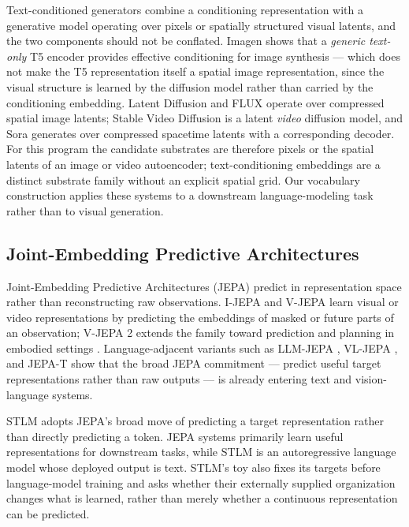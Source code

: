 \documentclass[11pt,a4paper]{article}
\begin{document}
Text-conditioned generators combine a conditioning representation with a generative model operating over pixels or spatially structured visual latents, and the two components should not be conflated. Imagen \cite{imagen2022} shows that a \emph{generic text-only} T5 encoder provides effective conditioning for image synthesis --- which does not make the T5 representation itself a spatial image representation, since the visual structure is learned by the diffusion model rather than carried by the conditioning embedding. Latent Diffusion \cite{stablediffusion} and FLUX \cite{flux2024} operate over compressed spatial image latents; Stable Video Diffusion \cite{svd2023} is a latent \emph{video} diffusion model, and Sora \cite{sora2024} generates over compressed spacetime latents with a corresponding decoder. For this program the candidate substrates are therefore pixels or the spatial latents of an image or video autoencoder; text-conditioning embeddings are a distinct substrate family without an explicit spatial grid. Our vocabulary construction applies these systems to a downstream language-modeling task rather than to visual generation.

\subsection{Joint-Embedding Predictive Architectures}

Joint-Embedding Predictive Architectures (JEPA) \cite{lecun2022path} predict in representation space rather than reconstructing raw observations. I-JEPA \cite{ijepa2023} and V-JEPA \cite{vjepa2024} learn visual or video representations by predicting the embeddings of masked or future parts of an observation; V-JEPA 2 extends the family toward prediction and planning in embodied settings \cite{vjepa2_2025}. Language-adjacent variants such as LLM-JEPA \cite{llmjepa2025}, VL-JEPA \cite{vljepa2025}, and JEPA-T \cite{jepat2025} show that the broad JEPA commitment --- predict useful target representations rather than raw outputs --- is already entering text and vision-language systems.

STLM adopts JEPA's broad move of predicting a target representation rather than directly predicting a token. JEPA systems primarily learn useful representations for downstream tasks, while STLM is an autoregressive language model whose deployed output is text. STLM's toy also fixes its targets before language-model training and asks whether their externally supplied organization changes what is learned, rather than merely whether a continuous representation can be predicted.
\end{document}
